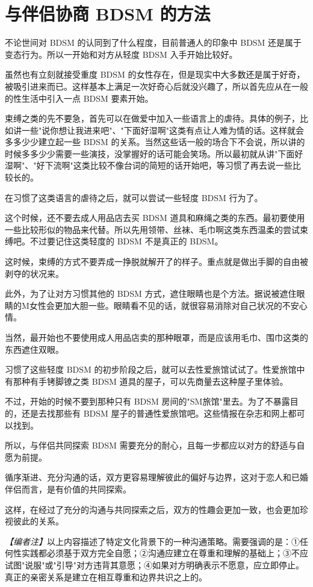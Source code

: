 \documentclass[12pt,UTF8]{ctexbook}
\begin{document}
\section{与伴侣协商 BDSM 的方法}

不论世间对 BDSM 的认同到了什么程度，目前普通人的印象中 BDSM 还是属于变态行为。所以一开始和对方从轻度 BDSM 入手开始比较好。

虽然也有立刻就接受重度 BDSM 的女性存在，但是现实中大多数还是属于好奇，被吸引进来而已。这样基本上满足一次好奇心后就没兴趣了，所以首先应从在一般的性生活中引入一点 BDSM 要素开始。

束缚之类的先不要急，首先可以在做爱中加入一些语言上的虐待。具体的例子，比如讲一些"说你想让我进来吧"、"下面好湿啊"这类有点让人难为情的话。这样就会多多少少建立起一些 BDSM 的关系。当然这些话一般的场合下不会说，所以讲的时候多多少少需要一些演技，没掌握好的话可能会笑场。所以最初就从讲"下面好湿啊"、"好下流啊"这类比较不像台词的简短的话开始吧，等习惯了再去说一些比较长的。

在习惯了这类语言的虐待之后，就可以尝试一些轻度 BDSM 行为了。

这个时候，还不要去成人用品店去买 BDSM 道具和麻绳之类的东西。最初要使用一些比较形似的物品来代替。所以先用领带、丝袜、毛巾啊这类东西温柔的尝试束缚吧。不过要记住这类轻度的 BDSM 不是真正的 BDSM。

这时候，束缚的方式不要弄成一挣脱就解开了的样子。重点就是做出手脚的自由被剥夺的状况来。

此外，为了让对方习惯其他的 BDSM 方式，遮住眼睛也是个方法。据说被遮住眼睛的M女性会更加大胆一些。眼睛看不见的话，就很容易消除对自己状况的不安心情。

当然，最开始也不要使用成人用品店卖的那种眼罩，而是应该用毛巾、围巾这类的东西遮住双眼。

习惯了这些轻度 BDSM 的初步阶段之后，就可以去性爱旅馆试试了。性爱旅馆中有那种有手铐脚镣之类 BDSM 道具的屋子，可以先商量去这种屋子里体验。

不过，开始的时候不要到那种只有 BDSM 房间的"SM旅馆"里去。为了不暴露目的，还是去找那些有 BDSM 屋子的普通性爱旅馆吧。这些情报在杂志和网上都可以找到。

所以，与伴侣共同探索 BDSM 需要充分的耐心，且每一步都应以对方的舒适与自愿为前提。

循序渐进、充分沟通的话，双方更容易理解彼此的偏好与边界，这对于恋人和已婚伴侣而言，是有价值的共同探索。

这样，在经过了充分的沟通与共同探索之后，双方的性趣会更加一致，也会更加珍视彼此的关系。

\textit{【编者注】}以上内容描述了特定文化背景下的一种沟通策略。需要强调的是：①任何性实践都必须基于双方完全自愿；②沟通应建立在尊重和理解的基础上；③不应试图"说服"或"引导"对方违背其意愿；④如果对方明确表示不愿意，应立即停止。真正的亲密关系是建立在相互尊重和边界共识之上的。
\end{document}

